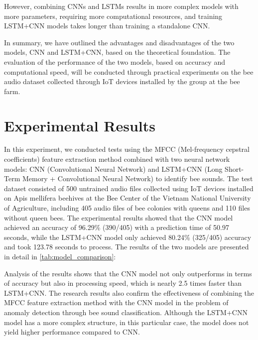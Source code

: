 \documentclass[twocolumn]{article}
\begin{document}
However, combining CNNs and LSTMs results in more complex models with more parameters,
requiring more computational resources, and training LSTM+CNN models takes longer than
training a standalone CNN.

In summary, we have outlined the advantages and disadvantages of the two models, CNN and
LSTM+CNN, based on the theoretical foundation. The evaluation of the performance of the
two models, based on accuracy and computational speed, will be conducted through practical
experiments on the bee audio dataset collected through IoT devices installed by the group
at the bee farm.

\section{Experimental Results}
In this experiment, we conducted tests using the MFCC (Mel-frequency cepstral coefficients)
feature extraction method combined with two neural network models: CNN (Convolutional Neural
Network) and LSTM+CNN (Long Short-Term Memory + Convolutional Neural Network) to identify
bee sounds. The test dataset consisted of 500 untrained audio files collected using IoT
devices installed on Apis mellifera beehives at the Bee Center of the Vietnam National University of Agriculture,
including 405 audio files of bee colonies with queens and 110 files without
queen bees. The experimental results showed that the CNN model achieved an accuracy of
96.29\% (390/405) with a prediction time of 50.97 seconds, while the LSTM+CNN model only
achieved 80.24\% (325/405) accuracy and took 123.78 seconds to process. The results of the
two models are presented in detail in \autoref{tab:model_comparison}:

\begin{table}[H]
  \centering
  \caption{Comparison of accuracy and processing time between models}
  \label{tab:model_comparison}
\end{table}

Analysis of the results shows that the CNN model not only outperforms in terms of accuracy
but also in processing speed, which is nearly 2.5 times faster than LSTM+CNN. The research
results also confirm the effectiveness of combining the MFCC feature extraction method with
the CNN model in the problem of anomaly detection through bee sound classification.
Although the LSTM+CNN model has a more complex structure, in this particular case, the
model does not yield higher performance compared to CNN.
\end{document}
